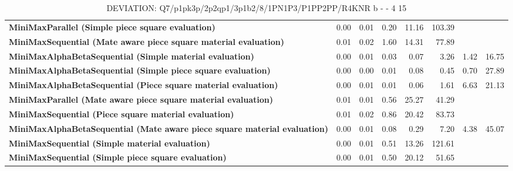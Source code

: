 \begin{table}[H]
{\begin{tabular}{|p{8cm}|*{7}{r|}}
\rowcolor[HTML]{FFFFFF}
\textbf{MiniMaxParallel (Simple piece square evaluation)}               & 0.00 & 0.01 & 0.20 & 11.16 & 103.39 &  &  \\

\rowcolor[HTML]{EFEFEF}
\textbf{MiniMaxSequential (Mate aware piece square material evaluation)}               & 0.01 & 0.02 & 1.60 & 14.31 & 77.89 &  &  \\

\rowcolor[HTML]{FFFFFF}
\textbf{MiniMaxAlphaBetaSequential (Simple material evaluation)}               & 0.00 & 0.01 & 0.03 & 0.07 & 3.26 & 1.42 & 16.75 \\

\rowcolor[HTML]{EFEFEF}
\textbf{MiniMaxAlphaBetaSequential (Simple piece square evaluation)}               & 0.00 & 0.00 & 0.01 & 0.08 & 0.45 & 0.70 & 27.89 \\

\rowcolor[HTML]{FFFFFF}
\textbf{MiniMaxAlphaBetaSequential (Piece square material evaluation)}               & 0.00 & 0.01 & 0.01 & 0.06 & 1.61 & 6.63 & 21.13 \\

\rowcolor[HTML]{EFEFEF}
\textbf{MiniMaxParallel (Mate aware piece square material evaluation)}               & 0.01 & 0.01 & 0.56 & 25.27 & 41.29 &  &  \\

\rowcolor[HTML]{FFFFFF}
\textbf{MiniMaxSequential (Piece square material evaluation)}               & 0.01 & 0.02 & 0.86 & 20.42 & 83.73 &  &  \\

\rowcolor[HTML]{EFEFEF}
\textbf{MiniMaxAlphaBetaSequential (Mate aware piece square material evaluation)}               & 0.00 & 0.01 & 0.08 & 0.29 & 7.20 & 4.38 & 45.07 \\

\rowcolor[HTML]{FFFFFF}
\textbf{MiniMaxSequential (Simple material evaluation)}               & 0.00 & 0.01 & 0.51 & 13.26 & 121.61 &  &  \\

\rowcolor[HTML]{EFEFEF}
\textbf{MiniMaxSequential (Simple piece square evaluation)}               & 0.00 & 0.01 & 0.50 & 20.12 & 51.65 &  &  \\

            \hline
        \end{tabular}%
    }
    \caption{DEVIATION: Q7/p1pk3p/2p2qp1/3p1b2/8/1PN1P3/P1PP2PP/R4KNR b - - 4 15}
    \label{tab:mid-game---discovery---mate-in-2---short-deviation}
\end{table}
